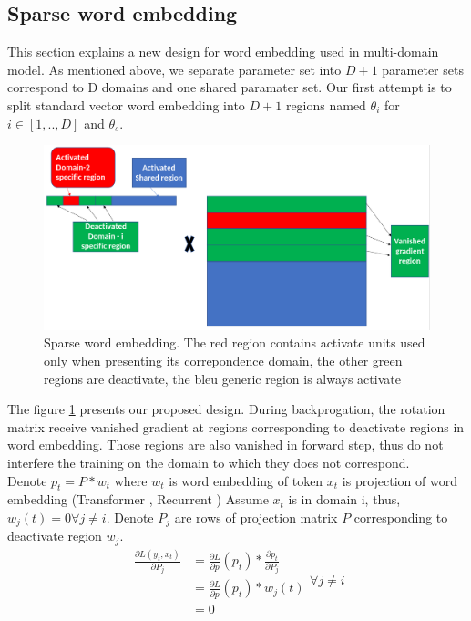 \documentclass[11pt,a4paper]{article}
\begin{document}
\subsection{Sparse word embedding}
This section explains a new design for word embedding used in multi-domain model. As mentioned above, we separate parameter set into $D+1$ parameter sets correspond to D domains and one shared paramater set. Our first attempt is to split standard vector word embedding into $D+1$ regions named $\theta_i$ for $i \in [1,..,D]$ and $\theta_s$.
\begin{figure}[h]
\center
    \includegraphics[width=0.8\linewidth]{Sparse1}
    \caption{Sparse word embedding. The red region contains activate units used only when presenting its correpondence domain, the other green regions are deactivate, the bleu generic region is always activate} 
    \label{network}
\end{figure}
The figure \ref{network} presents our proposed design. During backprogation, the rotation matrix receive vanished gradient at regions corresponding to deactivate regions in word embedding. Those regions are also vanished in forward step, thus do not interfere the training on the domain to which they does not correspond.\\
Denote $p_{t} = P * w_{t}$ where $w_{t}$ is word embedding of token $x_{t}$  is projection of word embedding (Transformer \cite{NIPS2017_7181}, Recurrent \cite{bahdanau2014neural})
Assume $x_{t}$ is in domain i, thus, $w_j(t) = 0 \forall j \neq i$. Denote $P_j$ are rows of projection matrix $P$ corresponding to deactivate region $w_j$.
\begin{equation}
\begin{split}
\frac{\partial L(y_t,x_t)}{\partial P_j} &=\frac{\partial L}{\partial p}(p_t) * \frac{\partial p_t}{\partial P_j} \\
								&= \frac{\partial L}{\partial p}(p_t) * w_j(t)\\
									&=0
\end{split} 
\forall j \neq i
\end{equation}
\end{document}
